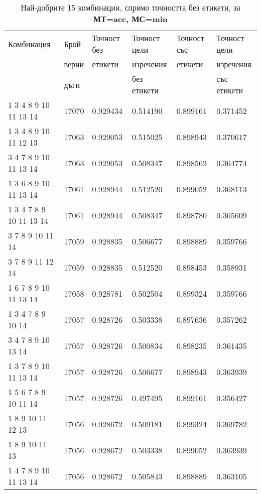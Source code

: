 \begin{table}[!htb] 
\caption{Най-добрите 15 комбинации, спрямо точността без етикети, за \textbf{МТ=acc, МС=min}}
  \begin{tabular}{|l|l|l|l|l|l|}
\hline 
Комбинация & Брой  & Точност без  & Точност цели  & Точност със  & Точност цели  \\
 & верни	& етикети & изречения & етикети & изречения \\
 & дъги	& 	& без етикети & 	& със етикети \\
\hline 
1 3 4 8 9 10 11 13 14 &	17070 &	0.929434 &	0.514190 &	0.899161 &	0.371452\\ 
\hline 
1 3 4 8 9 10 11 12 13 &	17063 &	0.929053 &	0.515025 &	0.898943 &	0.370617\\ 
\hline 
3 4 7 8 9 10 11 13 14 &	17063 &	0.929053 &	0.508347 &	0.898562 &	0.364774\\ 
\hline 
1 3 6 8 9 10 11 13 14 &	17061 &	0.928944 &	0.512520 &	0.899052 &	0.368113\\ 
\hline 
1 3 4 7 8 9 10 11 13 14 &	17061 &	0.928944 &	0.508347 &	0.898780 &	0.365609\\ 
\hline 
3 7 8 9 10 11 14 &	17059 &	0.928835 &	0.506677 &	0.898889 &	0.359766\\ 
\hline 
3 7 8 9 11 12 14 &	17059 &	0.928835 &	0.512520 &	0.898453 &	0.358931\\ 
\hline 
1 6 7 8 9 10 11 13 14 &	17058 &	0.928781 &	0.502504 &	0.899324 &	0.359766\\ 
\hline 
1 3 4 7 8 9 10 14 &	17057 &	0.928726 &	0.503338 &	0.897636 &	0.357262\\ 
\hline 
3 4 7 8 9 10 13 14 &	17057 &	0.928726 &	0.500834 &	0.898235 &	0.361435\\ 
\hline 
1 3 7 8 9 10 11 13 14 &	17057 &	0.928726 &	0.506677 &	0.898943 &	0.363939\\ 
\hline 
1 5 6 7 8 9 10 11 14 &	17057 &	0.928726 &	0.497495 &	0.899161 &	0.356427\\ 
\hline 
1 8 9 10 11 12 13 &	17056 &	0.928672 &	0.509181 &	0.899324 &	0.369782\\ 
\hline 
1 8 9 10 11 13 &	17056 &	0.928672 &	0.503338 &	0.899052 &	0.363939\\ 
\hline 
1 4 7 8 9 10 11 13 14 &	17056 &	0.928672 &	0.505843 &	0.898889 &	0.363105\\ 
\hline 
 \end{tabular}
 \label{tab:lab_min_acc}
 \end{table}